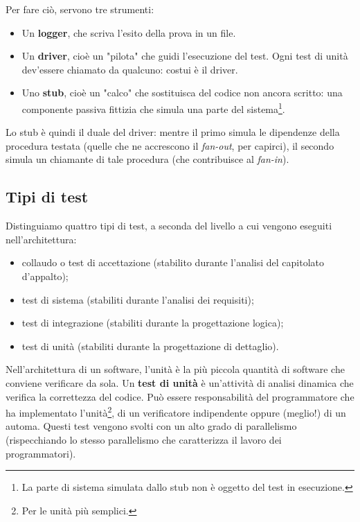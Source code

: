 \documentclass[a4paper]{article}
\begin{document}
		
Per fare ciò, servono tre strumenti:
		
	\begin{itemize}
		
			
	\item Un \textbf{logger}, che scriva l'esito della prova in un file.
			
	\item Un \textbf{driver}, cioè un "pilota" che guidi l'esecuzione del test. Ogni test di unità dev'essere chiamato da qualcuno: costui è il driver.
			
	\item Uno \textbf{stub}, cioè un "calco" che sostituisca del codice non ancora scritto: una componente passiva fittizia che simula una parte del sistema\footnote{La parte di sistema simulata dallo stub non è oggetto del test in esecuzione.}.
		
	\end{itemize}

		
Lo stub è quindi il duale del driver: mentre il primo simula le dipendenze della procedura testata (quelle che ne accrescono il \emph{fan-out}, per capirci), il secondo simula un chiamante di tale procedura (che contribuisce al \emph{fan-in}).

		
	\subsection{Tipi di test}

		
Distinguiamo quattro tipi di test, a seconda del livello a cui vengono eseguiti nell'architettura:
		
	\begin{itemize}
		
			
	\item collaudo o test di accettazione (stabilito durante l'analisi del capitolato d'appalto);
			
	\item test di sistema (stabiliti durante l'analisi dei requisiti);
			
	\item test di integrazione (stabiliti durante la progettazione logica);
			
	\item test di unità (stabiliti durante la progettazione di dettaglio).
		
	\end{itemize}

		
Nell'architettura di un software, l'unità è la più piccola quantità di software che conviene verificare da sola. Un \textbf{test di unità} è un'attività di analisi dinamica che verifica la correttezza del codice. Può essere responsabilità del programmatore che ha implementato l'unità\footnote{Per le unità più semplici.}, di un verificatore indipendente oppure (meglio!) di un automa. Questi test vengono svolti con un alto grado di parallelismo (rispecchiando lo stesso parallelismo che caratterizza il lavoro dei programmatori).
		
\end{document}
